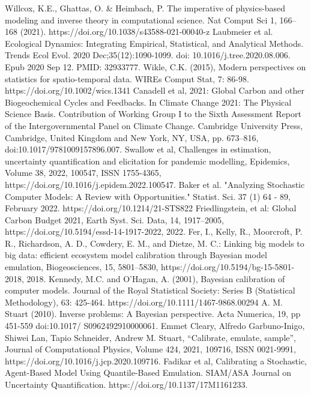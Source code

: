 \documentclass[12pt]{article}
\begin{document}
\begin{thebibliography}{20}
 Willcox, K.E., Ghattas, O. \& Heimbach, P. The imperative of physics-based modeling and inverse theory in computational science. Nat Comput Sci 1, 166–168 (2021). https://doi.org/10.1038/s43588-021-00040-z
 Laubmeier et al. Ecological Dynamics: Integrating Empirical, Statistical, and Analytical Methods. Trends Ecol Evol. 2020 Dec;35(12):1090-1099. doi: 10.1016/j.tree.2020.08.006. Epub 2020 Sep 12. PMID: 32933777.
 Wikle, C.K. (2015), Modern perspectives on statistics for spatio-temporal data. WIREs Comput Stat, 7: 86-98. https://doi.org/10.1002/wics.1341
 Canadell et al, 2021: Global Carbon and
other Biogeochemical Cycles and Feedbacks. In Climate Change 2021: The Physical Science Basis. Contribution of
Working Group I to the Sixth Assessment Report of the Intergovernmental Panel on Climate Change. Cambridge University Press,
Cambridge, United Kingdom and New York, NY, USA, pp. 673–816, doi:10.1017/9781009157896.007.
 Swallow et al, Challenges in estimation, uncertainty quantification and elicitation for pandemic modelling, Epidemics, Volume 38, 2022, 100547, ISSN 1755-4365, https://doi.org/10.1016/j.epidem.2022.100547.
 Baker et al. "Analyzing Stochastic Computer Models: A Review with Opportunities." Statist. Sci. 37 (1) 64 - 89, February 2022. https://doi.org/10.1214/21-STS822
 Friedlingstein, et al: Global Carbon Budget 2021, Earth Syst. Sci. Data, 14, 1917–2005, https://doi.org/10.5194/essd-14-1917-2022, 2022.
 Fer, I., Kelly, R., Moorcroft, P. R., Richardson, A. D., Cowdery, E. M., and Dietze, M. C.: Linking big models to big data: efficient ecosystem model calibration through Bayesian model emulation, Biogeosciences, 15, 5801–5830, https://doi.org/10.5194/bg-15-5801-2018, 2018.
 Kennedy, M.C. and O'Hagan, A. (2001), Bayesian calibration of computer models. Journal of the Royal Statistical Society: Series B (Statistical Methodology), 63: 425-464. https://doi.org/10.1111/1467-9868.00294
 A. M. Stuart (2010). Inverse problems: A Bayesian perspective. Acta Numerica, 19, pp 451-559 doi:10.1017/
S0962492910000061.
 Emmet Cleary, Alfredo Garbuno-Inigo, Shiwei Lan, Tapio Schneider, Andrew M. Stuart, “Calibrate, emulate, sample”, Journal of Computational Physics, Volume 424, 2021, 109716, ISSN 0021-9991, https://doi.org/10.1016/j.jcp.2020.109716.
 Fadikar et al, Calibrating a Stochastic, Agent-Based Model Using Quantile-Based Emulation. SIAM/ASA Journal on Uncertainty Quantification. https://doi.org/10.1137/17M1161233.

\end{thebibliography}
\end{document}
